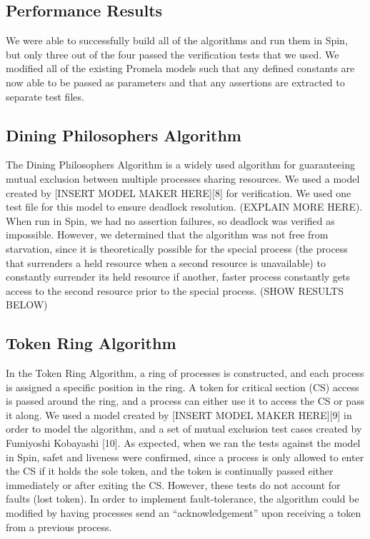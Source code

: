\documentclass[12pt]{article}
\begin{document}
\begin{flushleft}
\section{Performance Results}
We were able to successfully build all of the algorithms and run them in Spin, but only three out of the four passed the verification tests that we used. We modified all of the existing Promela models such that any defined constants are now able to be passed as parameters and that any assertions are extracted to separate test files.

\subsection{Dining Philosophers Algorithm}
The Dining Philosophers Algorithm is a widely used algorithm for guaranteeing mutual exclusion between multiple processes sharing resources. We used a model created by [INSERT MODEL MAKER HERE][8] for verification. We used one test file for this model to ensure deadlock resolution. (EXPLAIN MORE HERE). When run in Spin, we had no assertion failures, so deadlock was verified as impossible. However, we determined that the algorithm was not free from starvation, since it is theoretically possible for the special process (the process that surrenders a held resource when a second resource is unavailable) to constantly surrender its held resource if another, faster process constantly gets access to the second resource prior to the special process. (SHOW RESULTS BELOW)

\subsection{Token Ring Algorithm}
In the Token Ring Algorithm, a ring of processes is constructed, and each process is assigned a specific position in the ring. A token for critical section (CS) access is passed around the ring, and a process can either use it to access the CS or pass it along. We used a model created by [INSERT MODEL MAKER HERE][9] in order to model the algorithm, and a set of mutual exclusion test cases created by Fumiyoshi Kobayashi [10]. As expected, when we ran the tests against the model in Spin, safet and liveness were confirmed, since a process is only allowed to enter the CS if it holds the sole token, and the token is continually passed either immediately or after exiting the CS. However, these tests do not account for faults (lost token). In order to implement fault-tolerance, the algorithm could be modified by having processes send an “acknowledgement” upon receiving a token from a previous process.


\end{flushleft}
\end{document}
